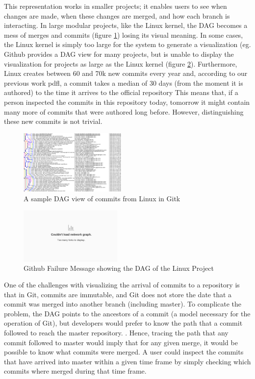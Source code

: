 \documentclass[conference, draftclsnofoot, draft]{IEEEtran}
\begin{document}
This representation works in smaller projects; it enables users to see
when changes are made, when these changes are merged, and how each branch is
interacting.  
In large modular projects, like the Linux kernel, the DAG becomes a
mess of merges and commits (figure \ref{fig:gitk}) losing its visual meaning.  In
some cases, the Linux kernel is simply too large for the system to generate a
visualization (eg. Github provides a DAG view for many projects, but is unable to
display the visualization for projects as large as the Linux kernel (figure
\ref{fig:gitfail}).
Furthermore, Linux creates between 60 and 70k new commits every year and, according to our previous work \cite{German2015}pdfl, 
a commit takes a median of 30 days (from the moment it is authored) to the time it arrives to the official repository
This means that, if a person inspected the commits in this repository today, tomorrow it might contain  many more
of commits that were authored long before. However, distinguishing these new commits is not trivial. 

\begin{figure}
        \centering
        \includegraphics[width=0.47\textwidth]{figures/gitk.png}
        \caption{A sample DAG view of commits from Linux in Gitk}
        \label{fig:gitk}
\end{figure}

\begin{figure}
        \centering
        \includegraphics[width=0.45\textwidth]{figures/github_viewer.png}
        \caption{Github Failure Message showing the DAG of the Linux Project}
        \label{fig:gitfail}
\end{figure}


One of the challenges with visualizing the arrival of commits to a repository is that
in Git, commits are immutable, and Git does not store the date that a commit was merged into another branch (including master).
To complicate the problem, the DAG points to the ancestors of a commit (a model necessary for the operation of Git), but developers 
would prefer to know the path that a commit followed to reach the master repository. .
Hence, tracing the path that any commit followed to master would imply that for any given merge, it would be possible to know what commits were merged. A user could
inspect the commits that have arrived into master within a given time frame by simply checking which commits where merged during that time frame.
\end{document}
